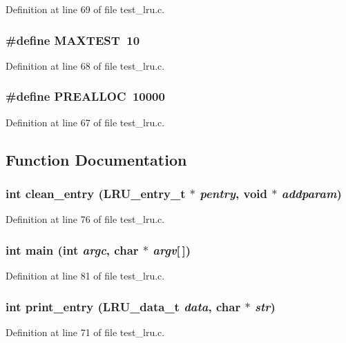 Definition at line 69 of file test\_\-lru.c.
\subsubsection[{MAXTEST}]{\setlength{\rightskip}{0pt plus 5cm}\#define MAXTEST~10}\label{test__lru_8c_a03d9dd35a7b43ebc597de16d46a0e845}


Definition at line 68 of file test\_\-lru.c.
\subsubsection[{PREALLOC}]{\setlength{\rightskip}{0pt plus 5cm}\#define PREALLOC~10000}\label{test__lru_8c_a9dadacd5ee41d21ea8974d66757983dd}


Definition at line 67 of file test\_\-lru.c.

\subsection{Function Documentation}
\subsubsection[{clean\_\-entry}]{\setlength{\rightskip}{0pt plus 5cm}int clean\_\-entry (LRU\_\-entry\_\-t $\ast$ {\em pentry}, \/  void $\ast$ {\em addparam})}\label{test__lru_8c_aed3b7c3b1bdb635f3c7d88e630279b79}


Definition at line 76 of file test\_\-lru.c.
\subsubsection[{main}]{\setlength{\rightskip}{0pt plus 5cm}int main (int {\em argc}, \/  char $\ast$ {\em argv}[$\,$])}\label{test__lru_8c_a0ddf1224851353fc92bfbff6f499fa97}


Definition at line 81 of file test\_\-lru.c.
\subsubsection[{print\_\-entry}]{\setlength{\rightskip}{0pt plus 5cm}int print\_\-entry (LRU\_\-data\_\-t {\em data}, \/  char $\ast$ {\em str})}\label{test__lru_8c_aea38d63e4172f007b92d4bfeebb6b6d2}


Definition at line 71 of file test\_\-lru.c.